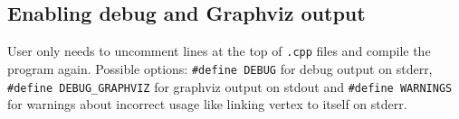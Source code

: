 \subsection{Enabling debug and Graphviz output}

User only needs to uncomment lines at the top of \texttt{.cpp} files and
compile the program again. Possible options:
\texttt{\#define DEBUG} for debug output on stderr,
\texttt{\#define DEBUG\_GRAPHVIZ} for graphviz output on stdout and
\texttt{\#define WARNINGS} for warnings about incorrect usage like linking
vertex to itself on stderr.
